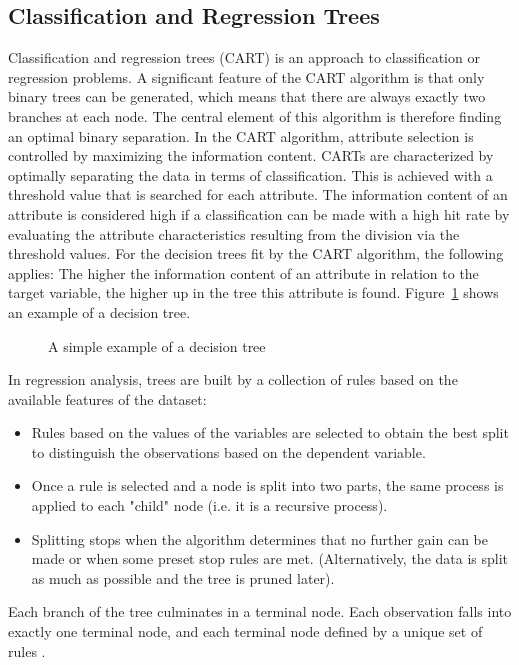 \subsection{Classification and Regression Trees}
Classification and regression trees (CART) is an approach to classification or regression problems. A significant feature of the CART algorithm is that only binary trees can be generated, which means that there are always exactly two branches at each node. The central element of this algorithm is therefore finding an optimal binary separation.
In the CART algorithm, attribute selection is controlled by maximizing the information content. CARTs are characterized by optimally separating the data in terms of classification. This is achieved with a threshold value that is searched for each attribute. The information content of an attribute is considered high if a classification can be made with a high hit rate by evaluating the attribute characteristics resulting from the division via the threshold values. For the decision trees fit by the CART algorithm, the following applies: The higher the information content of an attribute in relation to the target variable, the higher up in the tree this attribute is found. Figure~\ref{fig:tree} shows an example of a decision tree.\clearpage
\begin{figure}[H]
    \centering
    \caption{A simple example of a decision tree}
    \label{fig:tree}
\end{figure}
In regression analysis, trees are built by a collection of rules based on the available features of the dataset:
\begin{itemize}
    \item Rules based on the values of the variables are selected to obtain the best split to distinguish the observations based on the dependent variable.
    \item Once a rule is selected and a node is split into two parts, the same process is applied to each "child" node (i.e. it is a recursive process).
    \item Splitting stops when the algorithm determines that no further gain can be made or when some preset stop rules are met. (Alternatively, the data is split as much as possible and the tree is pruned later).
\end{itemize}
Each branch of the tree culminates in a terminal node. Each observation falls into exactly one terminal node, and each terminal node defined by a unique set of rules \autocite[][]{breiman1984classification}.
